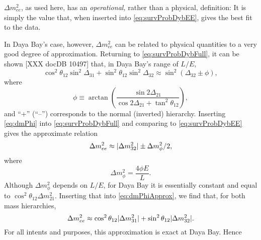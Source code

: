 \documentclass[../thesis.tex]{subfiles}
\begin{document}
\(\Delta m^2_{ee}\), as used here, has an \emph{operational,} rather than a
physical, definition: It is simply the value that, when inserted into
\eqref{eq:survProbDybEE}, gives the best fit to the data.
%
\begin{comment}
  Note that, if Daya Bay only measured antineutrinos at a single $L/E$, we could
  instead have made a truly physical definition of $\Delta m^2_{ee}$ by
  declaring that \[ \sin^2 \Delta_{ee} \equiv \cos^2\theta_{12} \sin^2
    \Delta_{31} + \sin^2\theta_{12} \sin^2 \Delta_{32}. \] However, the
  righthand side of this definition depends on $L/E$, so unless this dependence
  is shown to be negligible, it cannot be used in broadband analyses such as
  Daya Bay's.
\end{comment}
%
In Daya Bay's case, however, \(\Delta m^2_{ee}\) can be related to physical
quantities to a very good degree of approximation. Returning to
\eqref{eq:survProbDybFull}, it can be shown [XXX docDB 10497] that, in Daya
Bay's range of $L/E$,
\begin{equation}
  \label{eq:dmPhi}
  \cos^2\theta_{12} \sin^2\Delta_{31} + \sin^2\theta_{12}\sin^2\Delta_{32}
  \approx \sin^2 (\Delta_{32} \pm \phi),
\end{equation}
where
\begin{equation*}
  \phi \equiv \arctan\left( \frac{\sin2\Delta_{21}}{\cos2\Delta_{21}+ \tan^2
      \theta_{12}} \right),
\end{equation*}
and ``+'' (``--'') corresponds to the normal (inverted) hierarchy. Inserting
\eqref{eq:dmPhi} into \eqref{eq:survProbDybFull} and comparing to
\eqref{eq:survProbDybEE} gives the approximate relation
\begin{equation}
  \label{eq:dmPhiApprox}
  \Delta m^2_{ee} \approx \lvert \Delta m^2_{32}\rvert \pm \Delta m^2_\phi/2,
\end{equation}
where
\begin{equation*}
  \Delta m^2_\phi = \frac{4\phi E}{L}.
\end{equation*}
Although $\Delta m^2_\phi$ depends on $L/E$, for Daya Bay it is essentially
constant and equal to \(\cos^2\theta_{12}\Delta m^2_{21}\). Inserting that into
\eqref{eq:dmPhiApprox}, we find that, for both mass hierarchies,
\begin{equation}
  \label{eq:dmPhysical}
  \Delta m^2_{ee} \approx \cos^2\theta_{12}\lvert \Delta m^2_{31}\rvert + \sin^2\theta_{12}\lvert \Delta m^2_{32}\rvert.
\end{equation}
For all intents and purposes, this approximation is exact at Daya Bay. Hence
\end{document}
